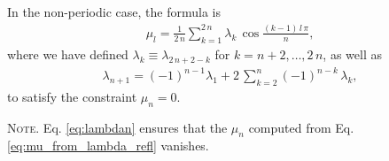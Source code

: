 \documentclass[reprint, floatfix]{revtex4-1}
\newcommand{\note}[1]{{\color{DarkGreen}\footnotesize \textsc{Note.} #1}}
\begin{document}
In the non-periodic case,
the formula is
%
\begin{align}
  \mu_l
  =
  \frac 1 { 2 \, n }
  \sum_{ k = 1 }^{ 2 \, n }
    \lambda_{ k } \,
    \cos \frac{ (k - 1) \, l \, \pi }
              {            n        }
  ,
\label{eq:mu_from_lambda_refl}
\end{align}
%
where
we have defined
$\lambda_k \equiv \lambda_{2 \, n + 2 - k}$
for $k = n + 2, \dots, 2 \, n$,
as well as
%
\begin{align}
  \lambda_{ n + 1 }
  =
  (-1)^{ n - 1 }
  \lambda_1
  +
  2 \, \sum_{ k = 2 }^{ n }
      (-1)^{n - k} \, \lambda_k
  ,
\label{eq:lambdan}
\end{align}
to satisfy the constraint $\mu_n = 0$.
%
\note{Eq. \eqref{eq:lambdan}
  ensures that the $\mu_n$
  computed from Eq. \eqref{eq:mu_from_lambda_refl}
  vanishes.

}
\end{document}
